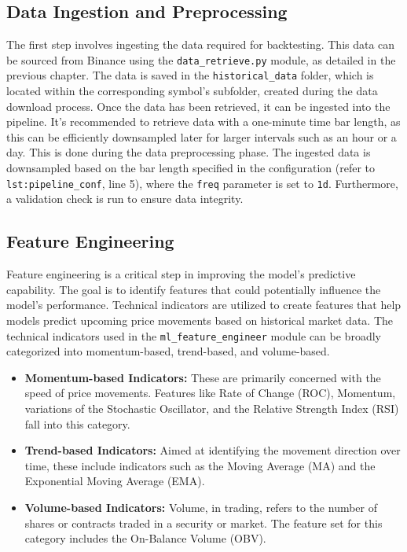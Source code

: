 \subsection{Data Ingestion and Preprocessing}
The first step involves ingesting the data required for backtesting. This data can be sourced from Binance using the \texttt{data\_retrieve.py} module, as detailed in the previous chapter.
The data is saved in the \texttt{historical\_data} folder, which is located within the corresponding symbol's subfolder, created during the data download process.
Once the data has been retrieved, it can be ingested into the pipeline. It's recommended to retrieve data with a one-minute time bar length,
as this can be efficiently downsampled later for larger intervals such as an hour or a day.
This is done during the data preprocessing phase. The ingested data is downsampled based on the bar length specified in the configuration (refer to \lstinline[label=lst:pipeline_conf]{lst:pipeline_conf}, line 5), where the \texttt{freq} parameter is set to \texttt{1d}.
Furthermore, a validation check is run to ensure data integrity.

\FloatBarrier %
\subsection{Feature Engineering}
Feature engineering is a critical step in improving the model's predictive capability.
The goal is to identify features that could potentially influence the model's performance.
Technical indicators are utilized to create features that help models predict upcoming price movements based on historical market data.
The technical indicators used in the \texttt{ml\_feature\_engineer} module can be broadly categorized into momentum-based, trend-based, and volume-based.


\begin{itemize}
    \item \textbf{Momentum-based Indicators:} These are primarily concerned with the speed of price movements. Features like Rate of Change (ROC), Momentum, variations of the Stochastic Oscillator, and the Relative Strength Index (RSI) fall into this category.

    \item \textbf{Trend-based Indicators:} Aimed at identifying the movement direction over time, these include indicators such as the Moving Average (MA) and the Exponential Moving Average (EMA).

    \item \textbf{Volume-based Indicators:} Volume, in trading, refers to the number of shares or contracts traded in a security or market. The feature set for this category includes the On-Balance Volume (OBV).
\end{itemize}

